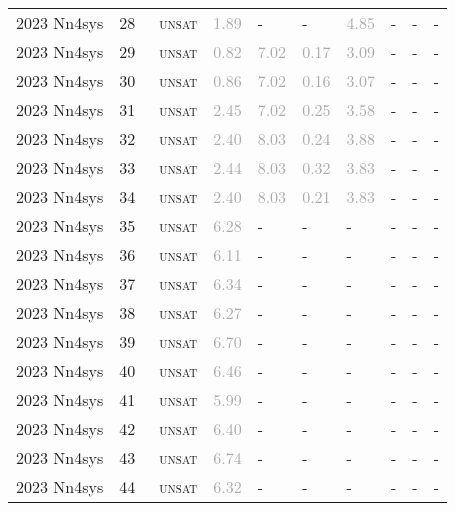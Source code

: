 \begin{center}
{\begin{longtable}{@{}llllllllll@{}}
2023 Nn4sys & 28 & ~\textsc{unsat} & \textcolor{darkgray}{1.89} & - & - & \textcolor{darkgray}{4.85} & - & - & - \\
2023 Nn4sys & 29 & ~\textsc{unsat} & \textcolor{darkgray}{0.82} & \textcolor{darkgray}{7.02} & \textcolor{darkgray}{0.17} & \textcolor{darkgray}{3.09} & - & - & - \\
2023 Nn4sys & 30 & ~\textsc{unsat} & \textcolor{darkgray}{0.86} & \textcolor{darkgray}{7.02} & \textcolor{darkgray}{0.16} & \textcolor{darkgray}{3.07} & - & - & - \\
2023 Nn4sys & 31 & ~\textsc{unsat} & \textcolor{darkgray}{2.45} & \textcolor{darkgray}{7.02} & \textcolor{darkgray}{0.25} & \textcolor{darkgray}{3.58} & - & - & - \\
2023 Nn4sys & 32 & ~\textsc{unsat} & \textcolor{darkgray}{2.40} & \textcolor{darkgray}{8.03} & \textcolor{darkgray}{0.24} & \textcolor{darkgray}{3.88} & - & - & - \\
2023 Nn4sys & 33 & ~\textsc{unsat} & \textcolor{darkgray}{2.44} & \textcolor{darkgray}{8.03} & \textcolor{darkgray}{0.32} & \textcolor{darkgray}{3.83} & - & - & - \\
2023 Nn4sys & 34 & ~\textsc{unsat} & \textcolor{darkgray}{2.40} & \textcolor{darkgray}{8.03} & \textcolor{darkgray}{0.21} & \textcolor{darkgray}{3.83} & - & - & - \\
2023 Nn4sys & 35 & ~\textsc{unsat} & \textcolor{darkgray}{6.28} & - & - & - & - & - & - \\
2023 Nn4sys & 36 & ~\textsc{unsat} & \textcolor{darkgray}{6.11} & - & - & - & - & - & - \\
2023 Nn4sys & 37 & ~\textsc{unsat} & \textcolor{darkgray}{6.34} & - & - & - & - & - & - \\
2023 Nn4sys & 38 & ~\textsc{unsat} & \textcolor{darkgray}{6.27} & - & - & - & - & - & - \\
2023 Nn4sys & 39 & ~\textsc{unsat} & \textcolor{darkgray}{6.70} & - & - & - & - & - & - \\
2023 Nn4sys & 40 & ~\textsc{unsat} & \textcolor{darkgray}{6.46} & - & - & - & - & - & - \\
2023 Nn4sys & 41 & ~\textsc{unsat} & \textcolor{darkgray}{5.99} & - & - & - & - & - & - \\
2023 Nn4sys & 42 & ~\textsc{unsat} & \textcolor{darkgray}{6.40} & - & - & - & - & - & - \\
2023 Nn4sys & 43 & ~\textsc{unsat} & \textcolor{darkgray}{6.74} & - & - & - & - & - & - \\
2023 Nn4sys & 44 & ~\textsc{unsat} & \textcolor{darkgray}{6.32} & - & - & - & - & - & - \\

\end{longtable}}
\end{center}
